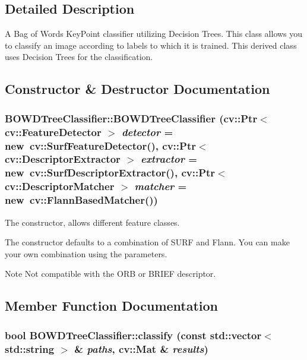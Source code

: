 \subsection{Detailed Description}
A Bag of Words KeyPoint classifier utilizing Decision Trees. This class allows you to classify an image according to labels to which it is trained. This derived class uses Decision Trees for the classification. 

\subsection{Constructor \& Destructor Documentation}
\hypertarget{classBOWDTreeClassifier_abc4ea05acf14a76e5670371f8acd1917}{
\subsubsection[{BOWDTreeClassifier}]{\setlength{\rightskip}{0pt plus 5cm}BOWDTreeClassifier::BOWDTreeClassifier (cv::Ptr$<$ cv::FeatureDetector $>$ {\em detector} = {\ttfamily new~cv::SurfFeatureDetector()}, \/  cv::Ptr$<$ cv::DescriptorExtractor $>$ {\em extractor} = {\ttfamily new~cv::SurfDescriptorExtractor()}, \/  cv::Ptr$<$ cv::DescriptorMatcher $>$ {\em matcher} = {\ttfamily new~cv::FlannBasedMatcher()})}}
\label{classBOWDTreeClassifier_abc4ea05acf14a76e5670371f8acd1917}


The constructor, allows different feature classes. 

The constructor defaults to a combination of SURF and Flann. You can make your own combination using the parameters.

\begin{DoxyNote}{Note}
Not compatible with the ORB or BRIEF descriptor. 
\end{DoxyNote}


\subsection{Member Function Documentation}
\hypertarget{classBOWDTreeClassifier_a5fcc85024df510e3c9ec813fe09e23fe}{
\subsubsection[{classify}]{\setlength{\rightskip}{0pt plus 5cm}bool BOWDTreeClassifier::classify (const std::vector$<$ std::string $>$ \& {\em paths}, \/  cv::Mat \& {\em results})}}
\label{classBOWDTreeClassifier_a5fcc85024df510e3c9ec813fe09e23fe}



